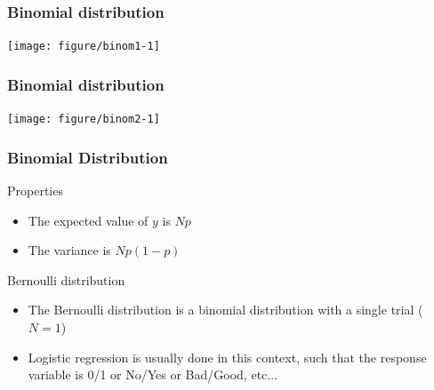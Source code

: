 \documentclass[color=usenames,dvipsnames]{beamer}\usepackage[]{graphicx}\usepackage[]{xcolor}
\newenvironment{knitrout}{}{} %
\begin{document}
\begin{frame}[fragile]
  \frametitle{Binomial distribution}%
  \vspace{-0.4cm}
\begin{center}
\begin{knitrout}
\color{fgcolor}
\texttt{[image: figure/binom1-1]} 
\end{knitrout}
\end{center}
\vfill
\end{frame}



\begin{frame}[fragile]
  \frametitle{Binomial distribution}%
  \vspace{-0.4cm}
\begin{center}
\begin{knitrout}
\color{fgcolor}
\texttt{[image: figure/binom2-1]} 
\end{knitrout}
\end{center}
\end{frame}




\begin{frame}
  \frametitle{Binomial Distribution}
  {Properties}
  \begin{itemize}
    \item The expected value of $y$ is $Np$
    \item The variance is $Np(1-p)$
  \end{itemize}
  \pause
  \vfill
  {Bernoulli distribution}
  \begin{itemize}
    \item The Bernoulli distribution is a binomial distribution with a
      single trial ($N=1$)
    \item Logistic regression is usually done in this context, such
      that the response variable is 0/1 or No/Yes or Bad/Good, etc$\dots$
  \end{itemize}
\end{frame}



\end{document}
